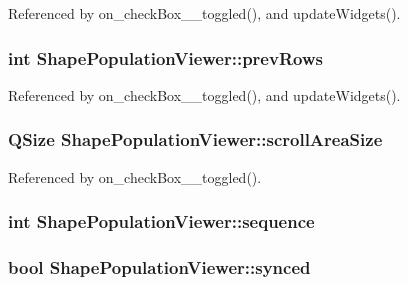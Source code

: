 Referenced by on\-\_\-check\-Box\-\_\-\_\-toggled(), and update\-Widgets().

\hypertarget{class_shape_population_viewer_adb72d49a80c7536e0d7ecad1ce3b7fda}{
\subsubsection[{prev\-Rows}]{\setlength{\rightskip}{0pt plus 5cm}int Shape\-Population\-Viewer\-::prev\-Rows\hspace{0.3cm}{\ttfamily [protected]}}}\label{class_shape_population_viewer_adb72d49a80c7536e0d7ecad1ce3b7fda}


Referenced by on\-\_\-check\-Box\-\_\-\_\-toggled(), and update\-Widgets().

\hypertarget{class_shape_population_viewer_ae3bbe127e4bac8870cb476084a6d4917}{
\subsubsection[{scroll\-Area\-Size}]{\setlength{\rightskip}{0pt plus 5cm}Q\-Size Shape\-Population\-Viewer\-::scroll\-Area\-Size\hspace{0.3cm}{\ttfamily [protected]}}}\label{class_shape_population_viewer_ae3bbe127e4bac8870cb476084a6d4917}


Referenced by on\-\_\-check\-Box\-\_\-\_\-toggled().

\hypertarget{class_shape_population_viewer_a083b364b39e12244501aca559b68708f}{
\subsubsection[{sequence}]{\setlength{\rightskip}{0pt plus 5cm}int Shape\-Population\-Viewer\-::sequence\hspace{0.3cm}{\ttfamily [protected]}}}\label{class_shape_population_viewer_a083b364b39e12244501aca559b68708f}
\hypertarget{class_shape_population_viewer_a42b6a8e7a7b2c90615e73c80988f547d}{
\subsubsection[{synced}]{\setlength{\rightskip}{0pt plus 5cm}bool Shape\-Population\-Viewer\-::synced\hspace{0.3cm}{\ttfamily [protected]}}}\label{class_shape_population_viewer_a42b6a8e7a7b2c90615e73c80988f547d}



